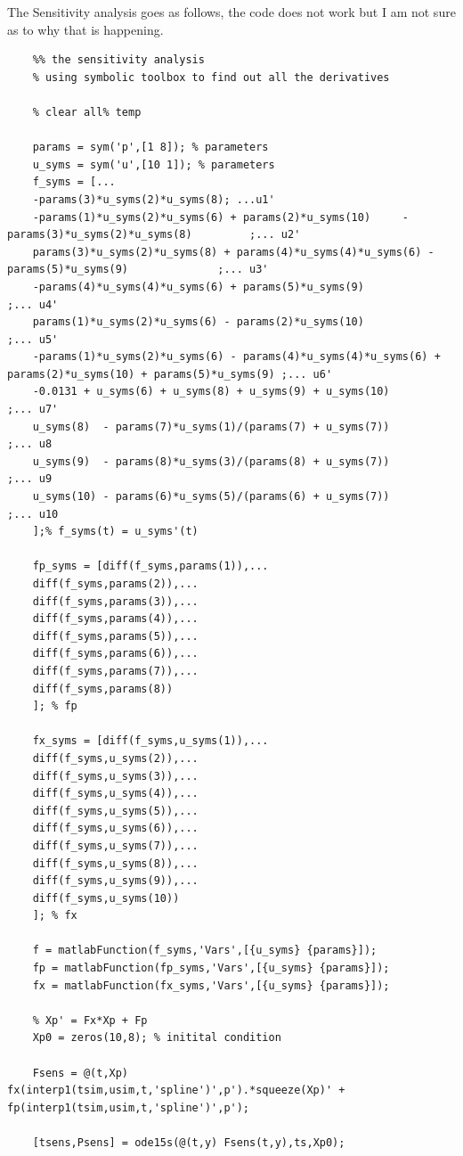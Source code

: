 The Sensitivity analysis goes as follows, the code does not work but I am not sure as to why that is happening.
\begin{lstlisting}
	%% the sensitivity analysis
	% using symbolic toolbox to find out all the derivatives
	
	% clear all% temp
	
	params = sym('p',[1 8]); % parameters 
	u_syms = sym('u',[10 1]); % parameters 
	f_syms = [...
	-params(3)*u_syms(2)*u_syms(8); ...u1'
	-params(1)*u_syms(2)*u_syms(6) + params(2)*u_syms(10)     - params(3)*u_syms(2)*u_syms(8)         ;... u2'
	params(3)*u_syms(2)*u_syms(8) + params(4)*u_syms(4)*u_syms(6) - params(5)*u_syms(9)              ;... u3'
	-params(4)*u_syms(4)*u_syms(6) + params(5)*u_syms(9)                               ;... u4'
	params(1)*u_syms(2)*u_syms(6) - params(2)*u_syms(10)                              ;... u5'
	-params(1)*u_syms(2)*u_syms(6) - params(4)*u_syms(4)*u_syms(6) + params(2)*u_syms(10) + params(5)*u_syms(9) ;... u6'
	-0.0131 + u_syms(6) + u_syms(8) + u_syms(9) + u_syms(10)                      ;... u7'    
	u_syms(8)  - params(7)*u_syms(1)/(params(7) + u_syms(7))                           ;... u8
	u_syms(9)  - params(8)*u_syms(3)/(params(8) + u_syms(7))                           ;... u9
	u_syms(10) - params(6)*u_syms(5)/(params(6) + u_syms(7))                           ;... u10
	];% f_syms(t) = u_syms'(t)
	
	fp_syms = [diff(f_syms,params(1)),...
	diff(f_syms,params(2)),...
	diff(f_syms,params(3)),...
	diff(f_syms,params(4)),...
	diff(f_syms,params(5)),...
	diff(f_syms,params(6)),...
	diff(f_syms,params(7)),...
	diff(f_syms,params(8))
	]; % fp
	
	fx_syms = [diff(f_syms,u_syms(1)),...
	diff(f_syms,u_syms(2)),...
	diff(f_syms,u_syms(3)),...
	diff(f_syms,u_syms(4)),...
	diff(f_syms,u_syms(5)),...
	diff(f_syms,u_syms(6)),...
	diff(f_syms,u_syms(7)),...
	diff(f_syms,u_syms(8)),...
	diff(f_syms,u_syms(9)),...
	diff(f_syms,u_syms(10))
	]; % fx
	
	f = matlabFunction(f_syms,'Vars',[{u_syms} {params}]);
	fp = matlabFunction(fp_syms,'Vars',[{u_syms} {params}]);
	fx = matlabFunction(fx_syms,'Vars',[{u_syms} {params}]);
	
	% Xp' = Fx*Xp + Fp
	Xp0 = zeros(10,8); % initital condition
	
	Fsens = @(t,Xp) fx(interp1(tsim,usim,t,'spline')',p').*squeeze(Xp)' + fp(interp1(tsim,usim,t,'spline')',p');
	
	[tsens,Psens] = ode15s(@(t,y) Fsens(t,y),ts,Xp0);
\end{lstlisting}
